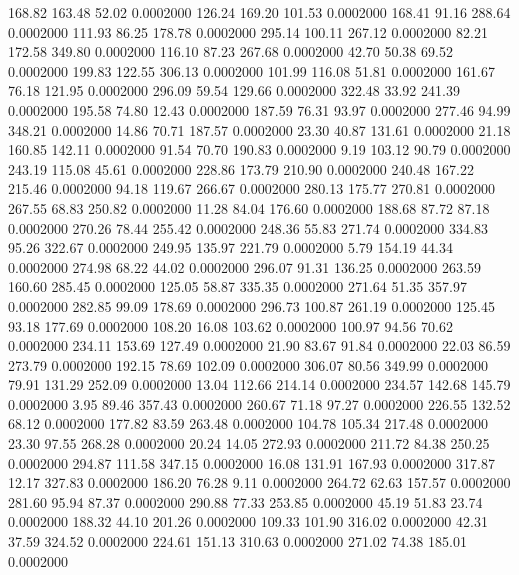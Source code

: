  168.82  163.48   52.02   0.0002000
 126.24  169.20  101.53   0.0002000
 168.41   91.16  288.64   0.0002000
 111.93   86.25  178.78   0.0002000
 295.14  100.11  267.12   0.0002000
  82.21  172.58  349.80   0.0002000
 116.10   87.23  267.68   0.0002000
  42.70   50.38   69.52   0.0002000
 199.83  122.55  306.13   0.0002000
 101.99  116.08   51.81   0.0002000
 161.67   76.18  121.95   0.0002000
 296.09   59.54  129.66   0.0002000
 322.48   33.92  241.39   0.0002000
 195.58   74.80   12.43   0.0002000
 187.59   76.31   93.97   0.0002000
 277.46   94.99  348.21   0.0002000
  14.86   70.71  187.57   0.0002000
  23.30   40.87  131.61   0.0002000
  21.18  160.85  142.11   0.0002000
  91.54   70.70  190.83   0.0002000
   9.19  103.12   90.79   0.0002000
 243.19  115.08   45.61   0.0002000
 228.86  173.79  210.90   0.0002000
 240.48  167.22  215.46   0.0002000
  94.18  119.67  266.67   0.0002000
 280.13  175.77  270.81   0.0002000
 267.55   68.83  250.82   0.0002000
  11.28   84.04  176.60   0.0002000
 188.68   87.72   87.18   0.0002000
 270.26   78.44  255.42   0.0002000
 248.36   55.83  271.74   0.0002000
 334.83   95.26  322.67   0.0002000
 249.95  135.97  221.79   0.0002000
   5.79  154.19   44.34   0.0002000
 274.98   68.22   44.02   0.0002000
 296.07   91.31  136.25   0.0002000
 263.59  160.60  285.45   0.0002000
 125.05   58.87  335.35   0.0002000
 271.64   51.35  357.97   0.0002000
 282.85   99.09  178.69   0.0002000
 296.73  100.87  261.19   0.0002000
 125.45   93.18  177.69   0.0002000
 108.20   16.08  103.62   0.0002000
 100.97   94.56   70.62   0.0002000
 234.11  153.69  127.49   0.0002000
  21.90   83.67   91.84   0.0002000
  22.03   86.59  273.79   0.0002000
 192.15   78.69  102.09   0.0002000
 306.07   80.56  349.99   0.0002000
  79.91  131.29  252.09   0.0002000
  13.04  112.66  214.14   0.0002000
 234.57  142.68  145.79   0.0002000
   3.95   89.46  357.43   0.0002000
 260.67   71.18   97.27   0.0002000
 226.55  132.52   68.12   0.0002000
 177.82   83.59  263.48   0.0002000
 104.78  105.34  217.48   0.0002000
  23.30   97.55  268.28   0.0002000
  20.24   14.05  272.93   0.0002000
 211.72   84.38  250.25   0.0002000
 294.87  111.58  347.15   0.0002000
  16.08  131.91  167.93   0.0002000
 317.87   12.17  327.83   0.0002000
 186.20   76.28    9.11   0.0002000
 264.72   62.63  157.57   0.0002000
 281.60   95.94   87.37   0.0002000
 290.88   77.33  253.85   0.0002000
  45.19   51.83   23.74   0.0002000
 188.32   44.10  201.26   0.0002000
 109.33  101.90  316.02   0.0002000
  42.31   37.59  324.52   0.0002000
 224.61  151.13  310.63   0.0002000
 271.02   74.38  185.01   0.0002000

